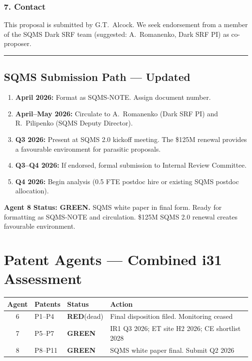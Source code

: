 \documentclass[11pt,a4paper]{article}
\newcommand{\GREEN}{\textcolor{dfdgreen}{\textbf{GREEN}}}
\newcommand{\RED}{\textcolor{dfdred}{\textbf{RED}}}
\begin{document}
\subsubsection*{7. Contact}

This proposal is submitted by G.T.~Alcock. We seek endorsement from a member of the SQMS Dark SRF team (suggested: A.~Romanenko, Dark SRF PI) as co-proposer.

\noindent\rule{\textwidth}{0.5pt}

\subsection{SQMS Submission Path --- Updated}

\begin{enumerate}
\item \textbf{April 2026:} Format as SQMS-NOTE. Assign document number.
\item \textbf{April--May 2026:} Circulate to A.~Romanenko (Dark SRF PI) and R.~Pilipenko (SQMS Deputy Director).
\item \textbf{Q3 2026:} Present at SQMS 2.0 kickoff meeting. The \$125M renewal provides a favourable environment for parasitic proposals.
\item \textbf{Q3--Q4 2026:} If endorsed, formal submission to Internal Review Committee.
\item \textbf{Q4 2026:} Begin analysis (0.5 FTE postdoc hire or existing SQMS postdoc allocation).
\end{enumerate}

\textbf{Agent 8 Status: \GREEN.} SQMS white paper in final form. Ready for formatting as SQMS-NOTE and circulation. \$125M SQMS 2.0 renewal creates favourable environment.

\section{Patent Agents --- Combined i31 Assessment}

\begin{center}
\begin{tabular}{clll}
\toprule
\textbf{Agent} & \textbf{Patents} & \textbf{Status} & \textbf{Action} \\
\midrule
6 & P1--P4 & \RED (dead) & Final disposition filed. Monitoring ceased \\
7 & P5--P7 & \GREEN & IR1 Q3 2026; ET site H2 2026; CE shortlist 2028 \\
8 & P8--P11 & \GREEN & SQMS white paper final. Submit Q2 2026 \\
\bottomrule
\end{tabular}
\end{center}
\end{document}
